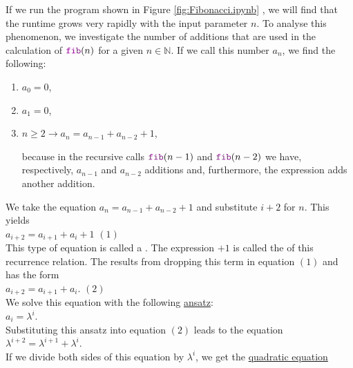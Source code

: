 If we run the program shown in Figure \ref{fig:Fibonacci.ipynb} , we will find that the runtime grows very rapidly with
the input parameter $n$.  To analyse this phenomenon, we investigate the number of additions that are used in the
calculation of $\mytt{fib}(n)$ for a given $n \in \mathbb{N}$.  If we call this number $a_n$, we find
the following:
\begin{enumerate}
\item $a_0 = 0$,
\item $a_1 = 0$,
\item $n \geq 2 \rightarrow a_n = a_{n-1} + a_{n-2} + 1$,

      because in the recursive calls $\mytt{fib}(n-1)$ and $\mytt{fib}(n-2)$ we have, respectively, 
      $a_{n-1}$ and $a_{n-2}$ additions and, furthermore, the expression
       adds another addition.
\end{enumerate}
We take the equation $a_n = a_{n-1} + a_{n-2} + 1$ and substitute $i+2$ for $n$.  This yields
\\[0.2cm]
\hspace*{1.3cm} $a_{i+2} = a_{i+1} + a_i + 1$ \hspace*{\fill} $(1)$
\\[0.2cm]
This type of equation is called a .  The expression $+ 1$ is
called the  of this recurrence relation.
The  
results from dropping this term in equation $(1)$ and has the form
\\[0.2cm]
\hspace*{1.3cm}
$a_{i+2} = a_{i+1} + a_i$. \hspace*{\fill} $(2)$
\\[0.2cm]
We solve this equation with the following \href{https://en.oxforddictionaries.com/definition/ansatz}{ansatz}:
\\[0.2cm]
\hspace*{1.3cm} $a_i = \lambda^i$. \\[0.2cm]
Substituting this ansatz into equation $(2)$ leads to the equation 
\\[0.2cm]
\hspace*{1.3cm}
$\lambda^{i+2} = \lambda^{i+1} + \lambda^i$.
\\[0.2cm]
If we divide both sides of this equation by $\lambda^i$, we get the
\href{https://en.wikipedia.org/wiki/Quadratic_equation}{quadratic equation}
